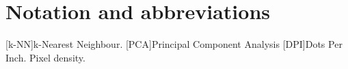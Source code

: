 \section{Notation and abbreviations}
\begin{acronym}[AWGN]
[k-NN]{k-Nearest Neighbour.}
[PCA]{Principal Component Analysis}
[DPI]{Dots Per Inch. Pixel density.}
\end{acronym}